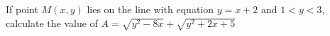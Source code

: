 If point $M(x,y)$ lies on the line with equation $y=x+2$ and $1<y<3$, calculate the value of
$A=\sqrt{y^2-8x}+\sqrt{y^2+2x+5}$